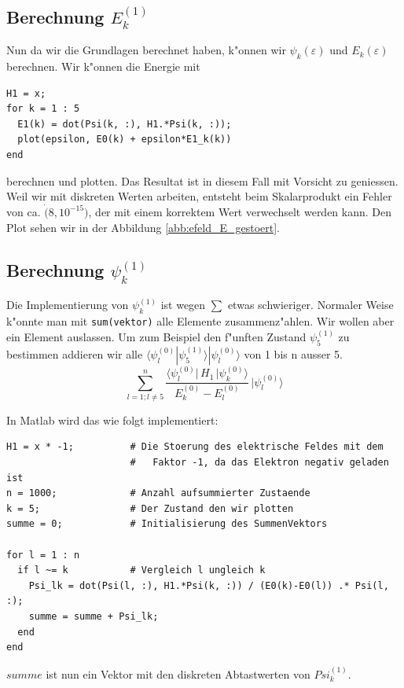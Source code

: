 \begin{refsection}
\subsection{Berechnung $E_k^{(1)}$}

Nun da wir die Grundlagen berechnet haben, k"onnen wir $\psi_k(\varepsilon)$ und $E_k(\varepsilon)$ berechnen.
Wir k"onnen die Energie mit
\begin{lstlisting}[style=Matlab]
H1 = x;
for k = 1 : 5
  E1(k) = dot(Psi(k, :), H1.*Psi(k, :));
  plot(epsilon, E0(k) + epsilon*E1_k(k))
end
\end{lstlisting}
berechnen und plotten.
Das Resultat ist in diesem Fall mit Vorsicht zu geniessen.
Weil wir mit diskreten Werten arbeiten, entsteht beim Skalarprodukt ein Fehler von ca. $\dot(8, 10^{-15})$,
der mit einem korrektem Wert verwechselt werden kann.
Den Plot sehen wir in der Abbildung \ref{abb:efeld_E_gestoert}.

\subsection{Berechnung $\psi_k^{(1)}$}

Die Implementierung von $\psi_k^{(1)}$ ist wegen $\sum$ etwas schwieriger.
Normaler Weise k"onnte man mit \verb|sum(vektor)| alle Elemente zusammenz"ahlen.
Wir wollen aber ein Element auslassen.
Um zum Beispiel den f"unften Zustand $\psi_5^{(1)}$ zu bestimmen addieren wir alle 
$\langle\psi_l^{(0)}|\psi_5^{(1)}\rangle|\psi_l^{(0)}\rangle$
 von 1 bis n ausser 5.
\begin{equation}
  \sum_{l=1 ; l\ne 5}^{n}
    \frac{\langle \psi_l^{(0)}|\, H_1 \,|\psi_k^{(0)}\rangle}{E_k^{(0)}-E_l^{(0)}}
        \,
    |\psi_l^{(0)}\rangle
\end{equation}

In Matlab wird das wie folgt implementiert:
\begin{lstlisting}[style=Matlab]
H1 = x * -1;          # Die Stoerung des elektrische Feldes mit dem
                      #   Faktor -1, da das Elektron negativ geladen ist
n = 1000;             # Anzahl aufsummierter Zustaende
k = 5;                # Der Zustand den wir plotten
summe = 0;            # Initialisierung des SummenVektors

for l = 1 : n
  if l ~= k           # Vergleich l ungleich k
    Psi_lk = dot(Psi(l, :), H1.*Psi(k, :)) / (E0(k)-E0(l)) .* Psi(l, :);
    summe = summe + Psi_lk;
  end
end
\end{lstlisting}
$summe$ ist nun ein Vektor mit den diskreten Abtastwerten von $Psi_k^{(1)}$.


\end{refsection}
